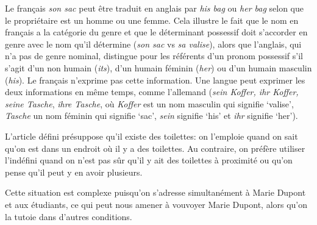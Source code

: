 {     Le français \textit{son sac} peut être traduit en anglais par \textit{his bag} ou \textit{her bag} selon que le propriétaire est un homme ou une femme. Cela illustre le fait que le nom en français a la catégorie du genre et que le déterminant possessif doit s’accorder en genre avec le nom qu’il détermine (\textit{son sac} vs \textit{sa valise}), alors que l’anglais, qui n’a pas de genre nominal, distingue pour les référents d’un pronom possessif s’il s’agit d’un non humain (\textit{its}), d’un humain féminin (\textit{her}) ou d’un humain masculin (\textit{his}). Le français n’exprime pas cette information. Une langue peut exprimer les deux informations en même temps, comme l’allemand (\textit{sein Koffer, ihr Koffer, seine Tasche}, \textit{ihre Tasche}, où \textit{Koffer} est un nom masculin qui signifie ‘valise’, \textit{Tasche} un nom féminin qui signifie ‘sac’, \textit{sein} signifie ‘his’ et \textit{ihr} signifie ‘her’).

     L’article défini présuppose qu’il existe des toilettes: on l’emploie quand on sait qu’on est dans un endroit où il y a des toilettes. Au contraire, on préfère utiliser l’indéfini quand on n’est pas sûr qu’il y ait des toilettes à proximité ou qu’on pense qu’il peut y en avoir plusieurs.

     Cette situation est complexe puisqu’on s’adresse simultanément à Marie Dupont et aux étudiants, ce qui peut nous amener à vouvoyer Marie Dupont, alors qu’on la tutoie dans d’autres conditions.
}
